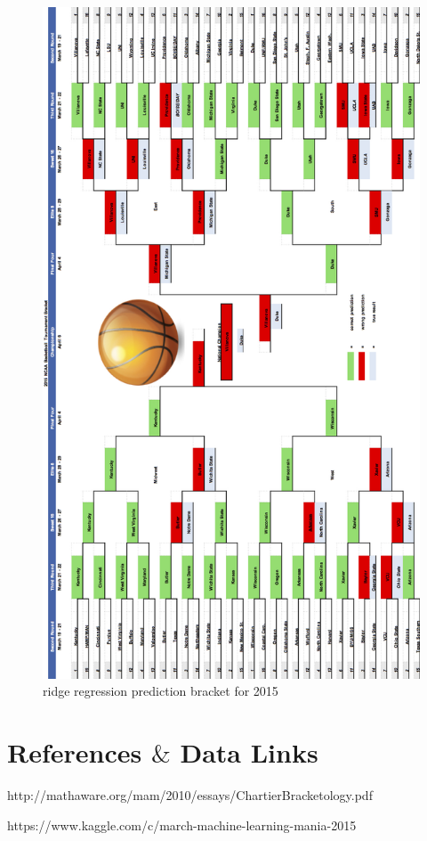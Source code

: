 \documentclass{article} %
\begin{document}
\begin{figure}[H]
\begin{center}
   \includegraphics[scale = 0.3]{bracket.jpg}
\end{center}
\caption{ridge regression prediction bracket for 2015}
\end{figure}




\section{References $\&$ Data Links}
http://mathaware.org/mam/2010/essays/ChartierBracketology.pdf

https://www.kaggle.com/c/march-machine-learning-mania-2015
\end{document}
